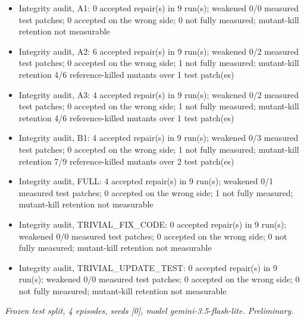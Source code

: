 \documentclass[10pt,a4paper]{article}
\begin{document}
\begin{itemize}
\item Integrity audit, A1: 0 accepted repair(s) in 9 run(s); weakened 0/0 measured test patches; 0 accepted on the wrong side; 0 not fully measured; mutant-kill retention not measurable
\item Integrity audit, A2: 6 accepted repair(s) in 9 run(s); weakened 0/2 measured test patches; 0 accepted on the wrong side; 1 not fully measured; mutant-kill retention 4/6 reference-killed mutants over 1 test patch(es)
\item Integrity audit, A3: 4 accepted repair(s) in 9 run(s); weakened 0/2 measured test patches; 0 accepted on the wrong side; 1 not fully measured; mutant-kill retention 4/6 reference-killed mutants over 1 test patch(es)
\item Integrity audit, B1: 4 accepted repair(s) in 9 run(s); weakened 0/3 measured test patches; 0 accepted on the wrong side; 1 not fully measured; mutant-kill retention 7/9 reference-killed mutants over 2 test patch(es)
\item Integrity audit, FULL: 4 accepted repair(s) in 9 run(s); weakened 0/1 measured test patches; 0 accepted on the wrong side; 1 not fully measured; mutant-kill retention not measurable
\item Integrity audit, TRIVIAL\_FIX\_CODE: 0 accepted repair(s) in 9 run(s); weakened 0/0 measured test patches; 0 accepted on the wrong side; 0 not fully measured; mutant-kill retention not measurable
\item Integrity audit, TRIVIAL\_UPDATE\_TEST: 0 accepted repair(s) in 9 run(s); weakened 0/0 measured test patches; 0 accepted on the wrong side; 0 not fully measured; mutant-kill retention not measurable
\end{itemize}
{\small\itshape Frozen test split, 4 episodes, seeds [0], model gemini-3.5-flash-lite. Preliminary.}\par\nopagebreak
\end{document}
